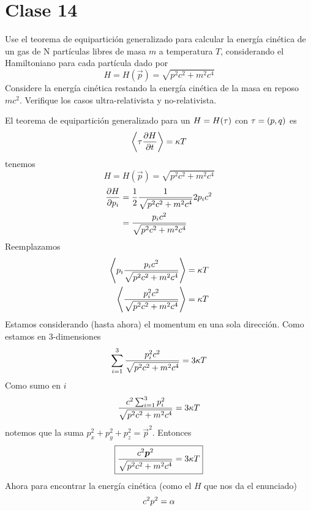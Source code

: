 \section{Clase 14}
\begin{ej}
	Use el teorema de equipartición generalizado para calcular la energía cinética de un gas de N partículas libres de masa $m$ a temperatura $T$, considerando el Hamiltoniano para cada partícula dado por
	\begin{equation}
  H=H(\vec{p})=\sqrt{p^2c^2+m^2c^4}
\end{equation}
Considere la energía cinética restando la energía cinética de la masa en reposo $mc^2$. Verifique los casos ultra-relativista y no-relativista.
\end{ej}

\begin{sol}
	El teorema de equipartición generalizado para un $H=H(\tau )$ con $\tau=(p,q)$ es
	\begin{equation}
  \ev{\t\pdv{H}{t}}=\k T
\end{equation}
tenemos
\begin{equation}
  H=H(\vec{p})=\sqrt{p^2c^2+m^2c^4}
\end{equation}
\begin{align}
  \pdv{H}{p_i}&=\frac{1}{2}\frac{1}{\sqrt{p^2c^2+m^2c^4}}2p_ic^2\\
  &=\frac{p_ic^2}{\sqrt{p^2c^2+m^2c^4}}
\end{align}
Reemplazamos
\begin{align}
  \ev{p_i\frac{p_ic^2}{\sqrt{p^2c^2+m^2c^4}}}&=\k T\\
  \ev{\frac{p_i^2c^2}{\sqrt{p^2c^2+m^2c^4}}}&=\k T
\end{align}
Estamos considerando (hasta ahora) el momentum en una sola dirección. Como estamos en $3$-dimensiones
\begin{equation}
  \sum_{i=1}^3\frac{p_i^2c^2}{\sqrt{p^2c^2+m^2c^4}}=3\kappa T
\end{equation}
Como sumo en $i$
\begin{equation}
  \frac{c^2\sum_{i=1}^3p_i^2}{\sqrt{p^2c^2+m^2c^4}}=3\kappa T
\end{equation}
notemos que la suma $p_x^2+p_y^2+p_z^2=\vec{p}^2$. Entonces
\begin{equation}
  \boxed{\frac{c^2\vb*{p}^2}{\sqrt{p^2c^2+m^2c^4}}=3\kappa T}
\end{equation}
Ahora para encontrar la energía cinética (como el $H$ que nos da el enunciado)
\begin{equation}
  c^2p^2=\alpha 
\end{equation}

\end{sol}
